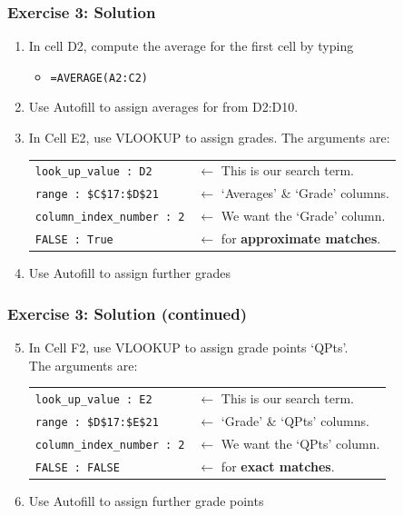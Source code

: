 \documentclass[12pt]{beamer}
\begin{document}
\begin{frame}
	\frametitle{Exercise 3: Solution}
	\begin{enumerate}
		\item In cell D2, compute the average for the first cell by typing
		\begin{itemize}
			\item  \texttt{=AVERAGE(A2:C2)}
		\end{itemize}
		\item Use Autofill to assign averages for from D2:D10.
		\item In Cell E2, use VLOOKUP to assign grades. The arguments are:
			\begin{tabular}{l l }
				\texttt{look\_up\_value : D2}& $\leftarrow$ This is our search term.\\
				\texttt{range : \$C\$17:\$D\$21}& $\leftarrow$ `Averages' \& `Grade' columns.\\
				\texttt{column\_index\_number : 2} &$\leftarrow$ We want the `Grade' column.\\
				\texttt{FALSE : True}& $\leftarrow$ for \textbf{approximate matches}.\\
			\end{tabular}
		\item Use Autofill to assign further grades
	\end{enumerate}
\end{frame}
\begin{frame}
	\frametitle{Exercise 3: Solution (continued)}
	\begin{enumerate}
		\setcounter{enumi}{4}
		\item In Cell F2, use VLOOKUP to assign grade points `QPts'.\\ The arguments are:
		\begin{tabular}{l l }
			\texttt{look\_up\_value : E2}& $\leftarrow$ This is our search term.\\
			\texttt{range : \$D\$17:\$E\$21}& $\leftarrow$ `Grade' \& `QPts' columns.\\
			\texttt{column\_index\_number : 2} &$\leftarrow$ We want the `QPts' column.\\
			\texttt{FALSE : FALSE}& $\leftarrow$ for \textbf{exact matches}.\\
		\end{tabular}
		\item Use Autofill to assign further grade points
	\end{enumerate}
\end{frame}
\end{document}
